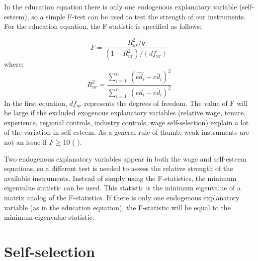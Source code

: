 \documentclass[12pt]{report}
\newcommand{\beq}{\begin{equation}}
\newcommand{\eeq}{\end{equation}}
\newcommand{\citee}[1]{\citename{#1} \citeyear{#1}}
\begin{document}
In the education equation there is only one endogenous explanatory variable (self-esteem), so a simple F-test can be used to test the strength of our instruments. For the education equation, the F-statistic is specified as follows:

\beq F = \frac{R_{ur}^2/q}{(1-R_{ur}^2)/(df_{ur})}\eeq
where:
\beq R_{ur}^2 = \frac{\sum_{i=1}^n\ (\hat{ed_i} - \bar{ed_i})^2}{\sum_{i=1}^n\ (ed_i - \bar{ed_i})^2}\eeq
In the first equation, $df_{ur}$ represents the degrees of freedom. The value of F will be large if the excluded exogenous explanatory variables (relative wage, tenure, experience, regional controls, industry controls, wage self-selection) explain a lot of the variation in self-esteem. As a general rule of thumb, weak instruments are not an issue if $F\geq10$ (\citee{CT2009}).

Two endogenous explanatory variables appear in both the wage and self-esteem equations, so a different test is needed to assess the relative strength of the available instruments. Instead of simply using the F-statistics, the minimum eigenvalue statistic can be used. This statistic is the minimum eigenvalue of a matrix analog of the F-statistics. If there is only one endogenous explanatory variable (as in the education equation), the F-statistic will be equal to the minimum eigenvalue statistic.

\section*{Self-selection}
\end{document}
